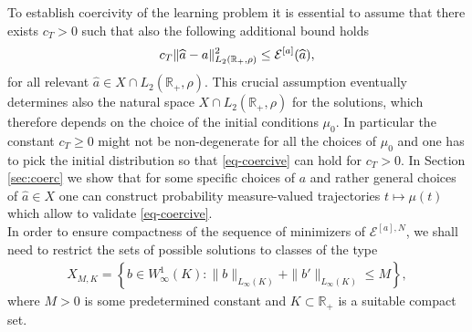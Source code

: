 To establish coercivity of the learning problem
it is essential  to assume that there exists  $c_T>0$ such that also the following additional bound holds
\begin{align}\label{eq-coercive}%
	c_T \| \widehat a - a \|^2_{L_2(\mathbb R_+,\rho)} \leq \Eahat,
\end{align}
for all relevant $\widehat a \in X \cap  L_2(\mathbb R_+,\rho)$. This crucial assumption eventually determines also the natural space $X \cap  L_2(\mathbb R_+,\rho)$ for the solutions,
which therefore depends on the choice of the initial conditions $\mu_0$. In particular the constant $c_T\geq 0$ might not be non-degenerate for all the choices of $\mu_0$
and one has to pick the initial distribution so that \eqref{eq-coercive} can hold for $c_T >0$. 
In Section \ref{sec:coerc} we show that for some specific choices of $a$ and rather general choices of $\widehat a \in X$ one can construct probability measure-valued trajectories $t \mapsto \mu(t)$ which allow to validate
\eqref{eq-coercive}.\\
In order to ensure compactness of the sequence of minimizers of $\mathcal E^{[a],N}$, we shall need to restrict the sets of possible solutions to classes of the type
\begin{align*}
X_{M,K} = \left\{b \in W^{1}_{\infty}(K) :
 \|b\|_{L_{\infty}(K)} + \|b'\|_{L_{\infty}(K)} \leq M
 \right\},
\end{align*}
where $M>0$ is some predetermined constant and $K \subset \mathbb R_+$ is a suitable compact set.


